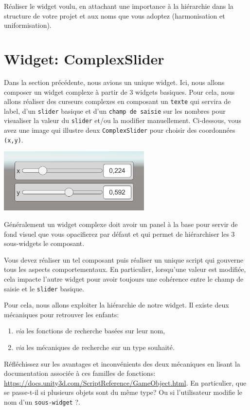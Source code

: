\documentclass[a4paper,10pt]{article}
\newenvironment{info}%
{\begin{tcolorbox}[breakable,colback=green!5!white,colframe=green!75!black,title=Information]}%
{\end{tcolorbox}}
\begin{document}
Réaliser le widget voulu, en attachant une importance à la hiérarchie dans la structure de votre projet et aux noms que vous adoptez (harmonisation et uniformisation).

\section{Widget: ComplexSlider}

Dans la section précédente, nous avions un unique widget. Ici, nous allons composer un widget complexe à partir de 3 widgets basiques. Pour cela, nous allons réaliser des curseurs complexes en composant un \texttt{texte} qui servira de label, d'un \texttt{slider} basique et d'un \texttt{champ de saisie} sur les nombres pour visualiser la valeur du \texttt{slider} et/ou la modifier manuellement. Ci-dessous, vous avez une image qui illustre deux \texttt{ComplexSlider} pour choisir des coordonnées \texttt{(x,y)}.

\begin{center}
	\includegraphics[width=0.5\linewidth]{rc/widget_complexslider_demo}
\end{center}

\begin{info}
Généralement un widget complexe doit avoir un panel à la base pour servir de fond visuel que vous opacifierez par défaut et qui permet de hiérarchiser les 3 sous-widgets le composant.
\end{info}

Vous devez réaliser un tel composant puis réaliser un unique script qui gouverne tous les aspects comportementaux. En particulier, lorsqu'une valeur est modifiée, cela impacte l'autre widget pour avoir toujours une cohérence entre le champ de saisie et le \texttt{slider} basique.

Pour cela, nous allons exploiter la hiérarchie de notre widget. Il existe deux mécaniques pour retrouver les enfants:
\begin{enumerate}
	\item \textit{via} les fonctions de recherche basées sur leur nom,
	\item \textit{via} les mécaniques de recherche sur un type souhaité.
\end{enumerate}
Réfléchissez sur les avantages et inconvénients des deux mécaniques en lisant la documentation associée à ces familles de fonctions: \url{https://docs.unity3d.com/ScriptReference/GameObject.html}.
En particulier, que se passe-t-il si plusieurs objets sont du même type? Ou si l'utilisateur modifie le nom d'un \texttt{sous-widget} ?.
\end{document}
